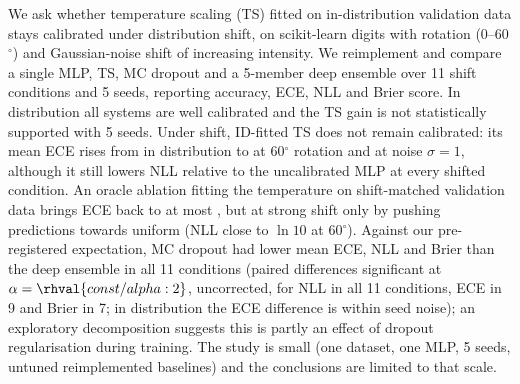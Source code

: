 We ask whether temperature scaling (TS) fitted on in-distribution validation data stays calibrated under distribution shift, on scikit-learn digits with rotation (0--60$^\circ$) and Gaussian-noise shift of increasing intensity. We reimplement and compare a single MLP, TS, MC dropout and a 5-member deep ensemble over 11 shift conditions and 5 seeds, reporting accuracy, ECE, NLL and Brier score. In distribution all systems are well calibrated and the TS gain is not statistically supported with 5 seeds. Under shift, ID-fitted TS does not remain calibrated: its mean ECE rises from  in distribution to  at 60$^\circ$ rotation and  at noise $\sigma=1$, although it still lowers NLL relative to the uncalibrated MLP at every shifted condition. An oracle ablation fitting the temperature on shift-matched validation data brings ECE back to at most , but at strong shift only by pushing predictions towards uniform (NLL close to $\ln 10$ at 60$^\circ$). Against our pre-registered expectation, MC dropout had lower mean ECE, NLL and Brier than the deep ensemble in all 11 conditions (paired differences significant at $\alpha=\rhval{const/alpha:2}$, uncorrected, for NLL in all 11 conditions, ECE in 9 and Brier in 7; in distribution the ECE difference is within seed noise); an exploratory decomposition suggests this is partly an effect of dropout regularisation during training. The study is small (one dataset, one MLP, 5 seeds, untuned reimplemented baselines) and the conclusions are limited to that scale.
